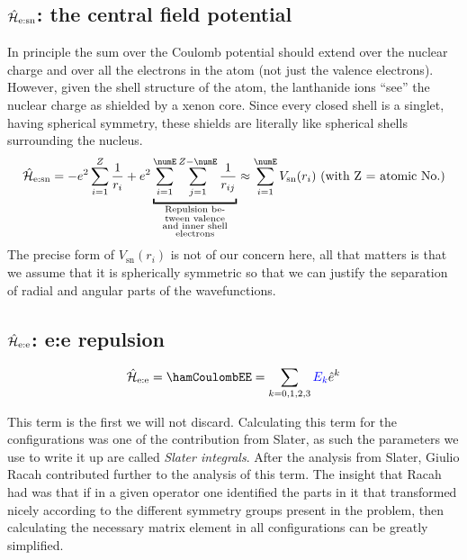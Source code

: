 \documentclass{article}
\begin{document}
\subsection{$\hat{\mathcal{H}}_\text{e:sn}$: the central field potential}

	In principle the sum over the Coulomb potential should extend over the nuclear charge and over all the electrons in the atom (not just the valence electrons). However, given the shell structure of the atom, the lanthanide ions ``see'' the nuclear charge as shielded by a xenon core. Since every closed shell is a singlet, having spherical symmetry, these shields are literally like spherical shells surrounding the nucleus.
    \begin{equation}
    \hamNuclearCoulombSymbol = -e^2 \sum_{i=1}^{Z} \frac{1}{r_{i}} + e^2 \underbracket{\sum_{i=1}^{\numE}\sum_{j=1}^{Z-\numE} \frac{1}{r_{ij}}}_{\substack{
            \text{Repulsion be-} \\
            \text{tween valence} \\
            \text{and inner shell} \\
            \text{electrons} 
            }
          } \approx \sum_{i=1}^\numE V_\text{sn}(r_i) \text{ (with Z = atomic No.)}
    \end{equation}
	The precise form of $V_\text{sn}(r_i)$ is not of our concern here, all that matters is that we assume that it is spherically symmetric so that we can justify the separation of radial and angular parts of the wavefunctions.

\subsection{$\hat{\mathcal{H}}_\text{e:e}$: e:e repulsion}
 
    \begin{equation}
        \hamCoulombEESymbol = \hamCoulombEE = \sum_{k=0,1,2,3} \Ek \hat{e}^k 
    \end{equation}  

    This term is the first we will not discard. Calculating this term for the \fn configurations was one of the contribution from Slater, as such the parameters we use to write it up are called \textit{Slater integrals}. After the analysis from Slater, Giulio Racah contributed further to the analysis of this term. The insight that Racah had was that if in a given operator one identified the parts in it that transformed nicely according to the different symmetry groups present in the problem, then calculating the necessary matrix element in all \fn configurations can   be greatly simplified.
\end{document}
